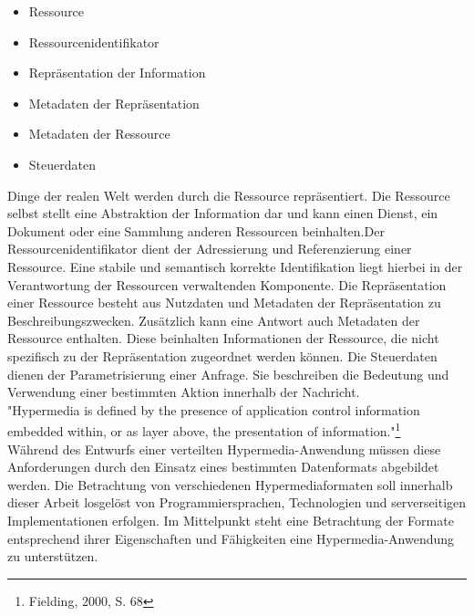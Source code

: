 \begin{itemize}
\item Ressource
\item Ressourcenidentifikator
\item Repräsentation der Information
\item Metadaten der Repräsentation
\item Metadaten der Ressource
\item Steuerdaten
\end{itemize}
Dinge der realen Welt werden durch die Ressource repräsentiert. Die Ressource selbst stellt eine Abstraktion der Information dar und kann einen Dienst, ein Dokument oder eine Sammlung anderen Ressourcen beinhalten.Der Ressourcenidentifikator dient der Adressierung und Referenzierung einer Ressource. Eine stabile und semantisch korrekte Identifikation liegt hierbei in der Verantwortung der Ressourcen verwaltenden Komponente. Die Repräsentation einer Ressource besteht aus Nutzdaten und Metadaten der Repräsentation zu Beschreibungszwecken. Zusätzlich kann eine Antwort auch Metadaten der Ressource enthalten. Diese beinhalten Informationen der Ressource, die nicht spezifisch zu der Repräsentation zugeordnet werden können. Die Steuerdaten dienen der Parametrisierung einer Anfrage. Sie beschreiben die Bedeutung und Verwendung einer bestimmten Aktion innerhalb der Nachricht.\\

"Hypermedia is defined by the presence of application control information embedded within, or as layer above, the presentation of information."\footnote{Fielding, 2000, S. 68}\\

Während des Entwurfs einer verteilten Hypermedia-Anwendung müssen diese Anforderungen durch den Einsatz eines bestimmten Datenformats abgebildet werden. Die Betrachtung von verschiedenen Hypermediaformaten soll innerhalb dieser Arbeit losgelöst von Programmiersprachen, Technologien und serverseitigen Implementationen erfolgen. Im Mittelpunkt steht eine Betrachtung der Formate entsprechend ihrer Eigenschaften und Fähigkeiten eine Hypermedia-Anwendung zu unterstützen.


